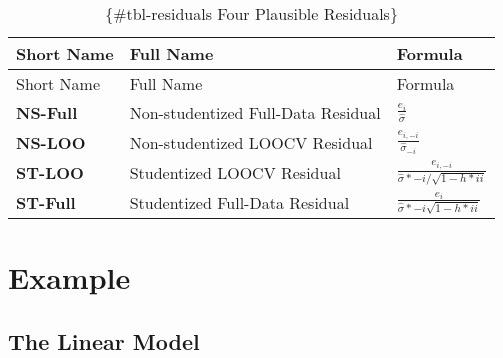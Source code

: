 \documentclass[
]{article}
\begin{document}
\begin{longtable}[]{@{}
  >{\raggedright\arraybackslash}p{}
  >{\raggedright\arraybackslash}p{}
  >{\raggedright\arraybackslash}p{}@{}}
\caption{\{\#tbl-residuals Four Plausible Residuals\}}\tabularnewline
\toprule\noalign{}
\begin{minipage}[b]{\linewidth}\raggedright
Short Name
\end{minipage} & \begin{minipage}[b]{\linewidth}\raggedright
Full Name
\end{minipage} & \begin{minipage}[b]{\linewidth}\raggedright
Formula
\end{minipage} \\
\midrule\noalign{}
\endfirsthead
\toprule\noalign{}
\begin{minipage}[b]{\linewidth}\raggedright
Short Name
\end{minipage} & \begin{minipage}[b]{\linewidth}\raggedright
Full Name
\end{minipage} & \begin{minipage}[b]{\linewidth}\raggedright
Formula
\end{minipage} \\
\midrule\noalign{}
\endhead
\bottomrule\noalign{}
\endlastfoot
\textbf{NS-Full} & Non-studentized Full-Data Residual &
\(\frac{e_i}{\hat{\sigma}}\) \\
\textbf{NS-LOO} & Non-studentized LOOCV Residual &
\(\frac{e_{i,-i}}{\hat{\sigma}_{-i}}\) \\
\textbf{ST-LOO} & Studentized LOOCV Residual &
\(\frac{e_{i,-i}}{\hat{\sigma}*{-i}/\sqrt{1-h*{ii}}}\) \\
\textbf{ST-Full} & Studentized Full-Data Residual &
\(\frac{e_i}{\hat{\sigma}*{-i}\sqrt{1-h*{ii}}}\) \\
\end{longtable}

\section{Example}\label{example}

\subsection{The Linear Model}\label{the-linear-model-1}
\end{document}
